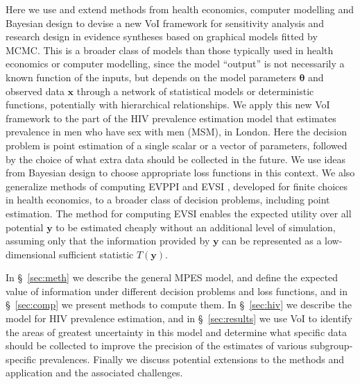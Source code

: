\documentclass[12pt]{article}\usepackage[]{graphicx}\usepackage[]{color}
\newcommand{\y}{\mathbf{y}}
\newcommand{\x}{\mathbf{x}}
\begin{document}
Here we use and extend methods from health economics, computer modelling and Bayesian design to devise a new VoI framework for sensitivity analysis and research design in evidence syntheses based on graphical models fitted by MCMC.  This is a broader class of models than those typically used in health economics or computer modelling, since the model ``output'' is not necessarily a known function of the inputs, but depends on the model parameters $\bm\theta$ and observed data $\x$ through a network of statistical models or deterministic functions, potentially with hierarchical relationships.   We apply this new VoI framework to the part of the HIV prevalence estimation model that estimates prevalence in men who have sex with men (MSM), in London.  Here the decision problem is point estimation of a single scalar or a vector of parameters, followed by the choice of what extra data should be collected in the future.   We use ideas from Bayesian design to choose appropriate loss functions in this context.  We also generalize methods of computing EVPPI \citep{strong:oakley:multievppi} and EVSI \citep{strong:oakley:evsi}, developed for finite choices in health economics, to a broader class of decision problems, including point estimation.  The method for computing EVSI enables the expected utility over all potential $\y$ to be estimated cheaply without an additional level of simulation, assuming only that the information provided by $\y$ can be represented as a low-dimensional sufficient statistic $T(\y)$.


In \S~\ref{sec:meth} we describe the general MPES model, and define the expected value of information under different decision problems and loss functions, and in \S~\ref{sec:comp} we present methods to compute them.  In \S~\ref{sec:hiv} we describe the model for HIV prevalence estimation, and in \S~\ref{sec:results} we use VoI to identify the areas of greatest uncertainty in this model and determine what specific data should be collected to improve the precision of the estimates of various subgroup-specific prevalences.   Finally we discuss potential extensions to the methods and application and the associated challenges.
\end{document}
